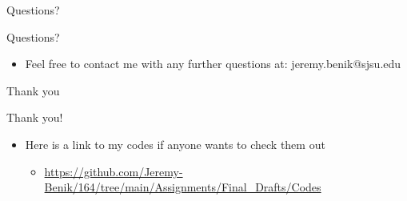 \documentclass{beamer}
\begin{document}
\begin{frame} {Questions?}
\begin{center}
{\fontsize{40}{50}\selectfont Questions?}
\end{center}
\begin{itemize}
	\setlength{\itemsep}{10mm}
	\item Feel free to contact me with any further questions at: jeremy.benik@sjsu.edu
\end{itemize}
\end{frame}



\begin{frame} {Thank you}
\begin{center}
{\fontsize{40}{50}\selectfont Thank you!}
\end{center}
\begin{itemize}
	\item Here is a link to my codes if anyone wants to check them out
	\begin{itemize}
 	\item \url{https://github.com/Jeremy-Benik/164/tree/main/Assignments/Final_Drafts/Codes}
  	\end{itemize}
\end{itemize}
	
\end{frame}
\end{document}
